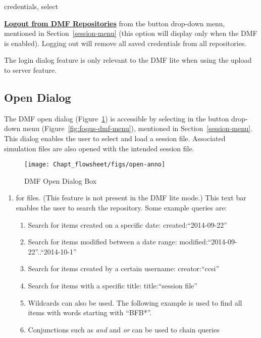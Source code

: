 credentials, select {\textbf{\underline{Logout from DMF Repositories}} from the
 button drop-down menu, mentioned in Section~\ref{session-menu} (this option will display only when the DMF is enabled).
Logging out will remove all saved credentials from all repositories.

The login dialog feature is only relevant to the DMF lite when using the upload to server feature.

\subsection{Open Dialog}
\label{open-dialog}

The DMF open dialog (Figure~\ref{fig:open-dialog}) is accessible by selecting
 in the  button drop-down menu (Figure~\ref{fig:foqus-dmf-menu}),
mentioned in Section~\ref{session-menu}. This dialog enables the user to select and load a session file.
Associated simulation files are also opened with the intended session file.

\begin{figure}[H]
  \centering
  \texttt{[image: Chapt\_flowsheet/figs/open-anno]}
  \caption{DMF Open Dialog Box}
  \label{fig:open-dialog}
\end{figure}

\begin{enumerate}
\item {} for files. (This feature is not present in the DMF lite mode.)
  This text bar enables the user to search the repository. Some example queries are:
  \begin {enumerate}[label=(\alph*)]
  \item Search for items created on a specific date: created:``2014-09-22''
  \item Search for items modified between a date range: modified:``2014-09-22''..``2014-10-1''
  \item Search for items created by a certain username: creator:``ccsi''
  \item Search for items with a specific title: title:``session file''
  \item Wildcards can also be used. The following example is used to find all items with words starting with ``BFB*''.
  \item Conjunctions such as \textit{and} and \textit{or} can be used to chain queries
  \end {enumerate}


\end{enumerate}}
